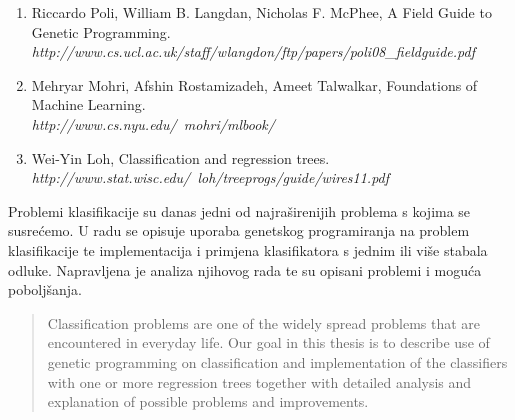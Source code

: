 \documentclass[times, utf8, zavrsni]{fer}
\begin{document}


\begin{enumerate}
	\item Riccardo Poli, William B. Langdan, Nicholas F. McPhee, A Field Guide to Genetic Programming. \\
	\emph{http://www.cs.ucl.ac.uk/staff/wlangdon/ftp/papers/poli08\_fieldguide.pdf}

	\item Mehryar Mohri, Afshin Rostamizadeh, Ameet Talwalkar, Foundations of Machine Learning. \\
	\emph{http://www.cs.nyu.edu/~mohri/mlbook/}

	\item Wei-Yin Loh, Classification and regression trees. \\
	\emph{http://www.stat.wisc.edu/~loh/treeprogs/guide/wires11.pdf}
\end{enumerate}


\begin{sazetak}
Problemi klasifikacije su danas jedni od najraširenijih problema s kojima se susrećemo. U radu se opisuje uporaba genetskog programiranja na problem klasifikacije te implementacija i primjena klasifikatora s jednim ili više stabala odluke. Napravljena je analiza njihovog rada te su opisani problemi i moguća poboljšanja.

\end{sazetak}

\begin{abstract}
Classification problems are one of the widely spread problems that are encountered in everyday life. Our goal in this thesis is to describe use of genetic programming on classification and implementation of the classifiers with one or more regression trees together with detailed analysis and explanation of possible problems and improvements.

\end{abstract}
\end{document}
